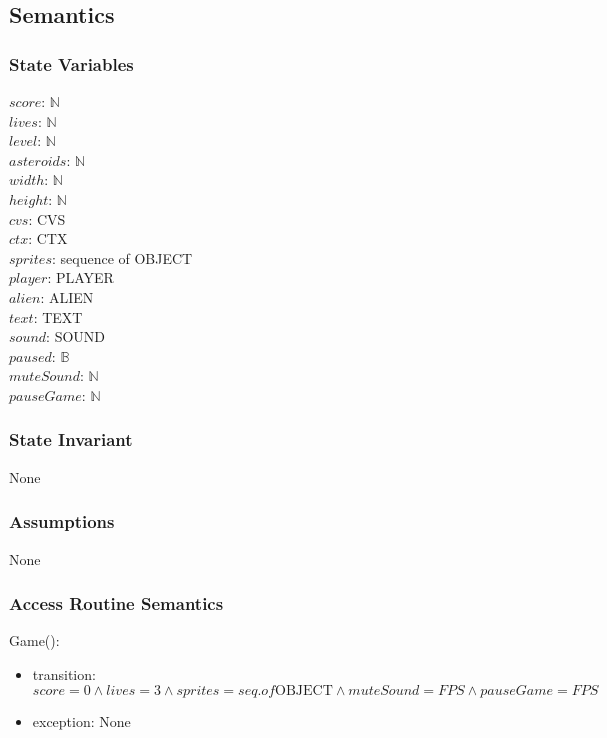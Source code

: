 \documentclass[12pt]{article}
\begin{document}
\subsection*{Semantics}

\subsubsection*{State Variables}

$score$: $\mathbb{N}$\\
$lives$: $\mathbb{N}$\\
$level$: $\mathbb{N}$\\
$asteroids$: $\mathbb{N}$\\
$width$: $\mathbb{N}$\\
$height$: $\mathbb{N}$\\
$cvs$: CVS\\
$ctx$: CTX\\
$sprites$: sequence of OBJECT\\
$player$: PLAYER\\
$alien$: ALIEN\\
$text$: TEXT\\
$sound$: SOUND\\
$paused$: $\mathbb{B}$\\
$muteSound$: $\mathbb{N}$\\
$pauseGame$: $\mathbb{N}$\\

\subsubsection*{State Invariant}

None

\subsubsection*{Assumptions}

%

None

\subsubsection*{Access Routine Semantics}

Game():
\begin{itemize}
    \item transition: $score = 0 \land lives = 3 \land sprites = seq. of \mbox{OBJECT} \land muteSound = FPS \land pauseGame = FPS$
    \item exception: None
\end{itemize}
\end{document}

